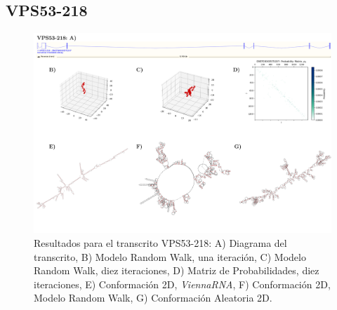 \documentclass[a4paper,11pt,titlepage]{article}
\theoremstyle{definition}
\begin{document}
\subsection*{VPS53-218}\label{subsec:gene3}

\begin{figure}[H]
    \centering
    \includegraphics[width=\textwidth]{images/VPS53-218_full.png}
    \small{\caption{Resultados para el transcrito VPS53-218: A) Diagrama del transcrito, B) Modelo Random Walk, una iteración, C) Modelo Random Walk, diez iteraciones, D) Matriz de Probabilidades, diez iteraciones, E) Conformación 2D, \textit{ViennaRNA}, F) Conformación 2D, Modelo Random Walk, G) Conformación Aleatoria 2D.}}\normalsize
    \label{fig:VPS53-218-diag}
\end{figure}
\end{document}
